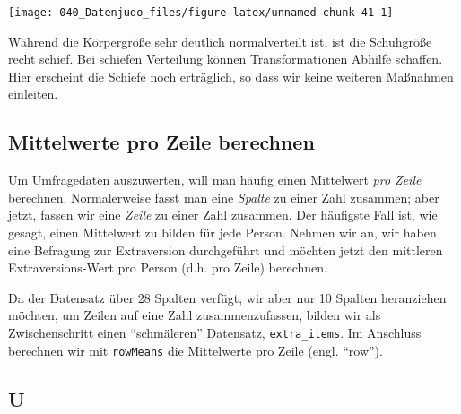 \documentclass[12pt,]{book}
\makeatletter
\newenvironment{Shaded}{\begin{snugshade}}{\end{snugshade}}
\newcommand{\KeywordTok}[1]{\textcolor[rgb]{0.13,0.29,0.53}{\textbf{{#1}}}}
\newcommand{\StringTok}[1]{\textcolor[rgb]{0.31,0.60,0.02}{{#1}}}
\newcommand{\NormalTok}[1]{{#1}}
\newenvironment{kframe}{%
\medskip{}
\setlength{\fboxsep}{.8em}
 \def\at@end@of@kframe{}%
 \ifinner\ifhmode%
  \def\at@end@of@kframe{\end{minipage}}%
  \begin{minipage}{\columnwidth}%
 \fi\fi%
 \def\FrameCommand##1{\hskip\@totalleftmargin \hskip-\fboxsep
 \colorbox{shadecolor}{##1}\hskip-\fboxsep
     \hskip-\linewidth \hskip-\@totalleftmargin \hskip\columnwidth}%
 \MakeFramed {\advance\hsize-\width
   \@totalleftmargin\z@ \linewidth\hsize
   \@setminipage}}%
 {\par\unskip\endMakeFramed%
 \at@end@of@kframe}
\renewenvironment{Shaded}{\begin{kframe}}{\end{kframe}}
\makeatother
\begin{document}
\begin{center}\texttt{[image: 040\_Datenjudo\_files/figure-latex/unnamed-chunk-41-1]} \end{center}

Während die Körpergröße sehr deutlich normalverteilt ist, ist die
Schuhgröße recht schief. Bei schiefen Verteilung können Transformationen
Abhilfe schaffen. Hier erscheint die Schiefe noch erträglich, so dass
wir keine weiteren Maßnahmen einleiten.

\subsection{Mittelwerte pro Zeile
berechnen}\label{mittelwerte-pro-zeile-berechnen}

Um Umfragedaten auszuwerten, will man häufig einen Mittelwert \emph{pro
Zeile} berechnen. Normalerweise fasst man eine \emph{Spalte} zu einer
Zahl zusammen; aber jetzt, fassen wir eine \emph{Zeile} zu einer Zahl
zusammen. Der häufigste Fall ist, wie gesagt, einen Mittelwert zu bilden
für jede Person. Nehmen wir an, wir haben eine Befragung zur
Extraversion durchgeführt und möchten jetzt den mittleren
Extraversions-Wert pro Person (d.h. pro Zeile) berechnen.

\begin{Shaded}
\end{Shaded}

Da der Datensatz über 28 Spalten verfügt, wir aber nur 10 Spalten
heranziehen möchten, um Zeilen auf eine Zahl zusammenzufassen, bilden
wir als Zwischenschritt einen ``schmäleren'' Datensatz,
\texttt{extra\_items}. Im Anschluss berechnen wir mit \texttt{rowMeans}
die Mittelwerte pro Zeile (engl. ``row'').

\subsection{U}\label{u}

\begin{Shaded}
\end{Shaded}
\end{document}
